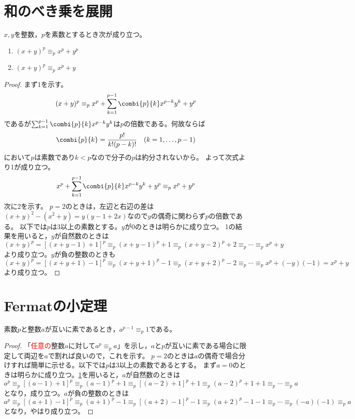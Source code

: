     \section{和のべき乗を展開}
        \label{整数の合同:和のべき乗を展開}
        $x,y$を整数，$p$を素数とするとき次が成り立つ。
        \begin{enumerate}
            \item $(x+y)^p \equiv_p x^p + y^p$
            \item $(x+y)^p \equiv_p x^p + y$
        \end{enumerate}
        \begin{proof}
            まず1を示す。
            \[(x+y)^p \equiv_p x^p + \sum_{k=1}^{p-1} \combi{p}{k}x^{p-k}y^k + y^p\]
            であるが$\sum_{k=1}^{p-1} \combi{p}{k}x^{p-k}y^k$は$p$の倍数である。何故ならば
            \[ \combi{p}{k} =\frac{p!}{k!(p-k)!} \quad (k=1,\dotsc,p-1) \]
            において$p$は素数であり$k<p$なので分子の$p$は約分されないから。
            よって次式より1が成り立つ。
            \[ x^p + \sum_{k=1}^{p-1} \combi{p}{k}x^{p-k}y^k + y^p \equiv_p x^p + y^p \]
            次に2を示す。
            $p=2$のときは，左辺と右辺の差は$(x+y)^2 - (x^2+y) = y(y-1+2x)$なので$y$の偶奇に関わらず$p$の倍数である。
            以下では$p$は3以上の素数とする。$y$が0のときは明らかに成り立つ。
            1の結果を用いると，$y$が自然数のときは
            \[(x+y)^p = [(x+y-1) + 1]^p \equiv_p (x+y-1)^p + 1 \equiv_p (x+y-2)^p + 2 \equiv_p \dotsb \equiv_p x^p + y \]
            より成り立つ。$y$が負の整数のときも
            \[(x+y)^p = [(x+y+1) - 1]^p \equiv_p (x+y+1)^p - 1 \equiv_p (x+y+2)^p - 2 \equiv_p \dotsb \equiv_p x^p + (-y)(-1) = x^p + y \]
            より成り立つ。
        \end{proof}
    \section{Fermatの小定理}
        \begin{shadebox}
            素数$p$と整数$a$が互いに素であるとき，$a^{p-1} \equiv_p 1$である。
        \end{shadebox}
        \begin{proof}
            「\textcolor{red}{任意の}整数$a$に対して$a^p \equiv_p a$」を示し，$a$と$p$が互いに素である場合に限定して両辺を$a$で割れば良いので，これを示す。
            $p=2$のときは$a$の偶奇で場合分けすれば簡単に示せる。以下では$p$は3以上の素数であるとする。
            まず$a=0$のときは明らかに成り立つ。\ref{整数の合同:和のべき乗を展開}を用いると，$a$が自然数のときは
            \[ a^p \equiv_p [(a-1)+1]^p \equiv_p (a-1)^p + 1 \equiv_p [(a-2) + 1]^p + 1 \equiv_p (a-2)^p + 1 + 1 \equiv_p \dotsb \equiv_p a\]
            となり，成り立つ。$a$が負の整数のときは
            \[ a^p \equiv_p [(a+1)-1]^p \equiv_p (a+1)^p - 1 \equiv_p [(a+2) - 1]^p - 1 \equiv_p (a+2)^p - 1 - 1 \equiv_p \dotsb \equiv_p (-a)(-1) \equiv_p a \]
            となり，やはり成り立つ。
        \end{proof}